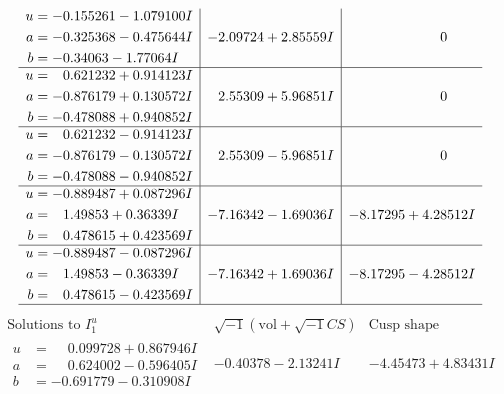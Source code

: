 \documentclass[1p]{elsarticle_modified}
\theoremstyle{definition}
\newcommand{\I}{\sqrt{-1}}
\begin{document}
$$\begin{array}{c|c|c}
\begin{aligned}
u &= -0.155261 - 1.079100 I \\
a &= -0.325368 - 0.475644 I \\
b &= -0.34063 - 1.77064 I\end{aligned}
 & -2.09724 + 2.85559 I & \phantom{-0.000000 } 0 \\ \hline\begin{aligned}
u &= \phantom{-}0.621232 + 0.914123 I \\
a &= -0.876179 + 0.130572 I \\
b &= -0.478088 + 0.940852 I\end{aligned}
 & \phantom{-}2.55309 + 5.96851 I & \phantom{-0.000000 } 0 \\ \hline\begin{aligned}
u &= \phantom{-}0.621232 - 0.914123 I \\
a &= -0.876179 - 0.130572 I \\
b &= -0.478088 - 0.940852 I\end{aligned}
 & \phantom{-}2.55309 - 5.96851 I & \phantom{-0.000000 } 0 \\ \hline\begin{aligned}
u &= -0.889487 + 0.087296 I \\
a &= \phantom{-}1.49853 + 0.36339 I \\
b &= \phantom{-}0.478615 + 0.423569 I\end{aligned}
 & -7.16342 - 1.69036 I & -8.17295 + 4.28512 I \\ \hline\begin{aligned}
u &= -0.889487 - 0.087296 I \\
a &= \phantom{-}1.49853 - 0.36339 I \\
b &= \phantom{-}0.478615 - 0.423569 I\end{aligned}
 & -7.16342 + 1.69036 I & -8.17295 - 4.28512 I\\
 \hline 
 \end{array}$$\newpage$$\begin{array}{c|c|c}  
\text{Solutions to }I^u_{1}& \I (\text{vol} + \sqrt{-1}CS) & \text{Cusp shape}\\
 \hline 
\begin{aligned}
u &= \phantom{-}0.099728 + 0.867946 I \\
a &= \phantom{-}0.624002 - 0.596405 I \\
b &= -0.691779 - 0.310908 I\end{aligned}
 & -0.40378 - 2.13241 I & -4.45473 + 4.83431 I \\ \hline\begin{aligned}

\end{aligned}
\end{array}$$
\end{document}
